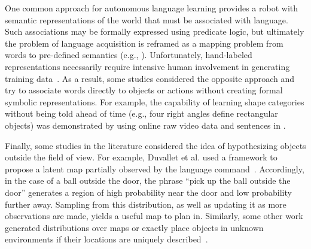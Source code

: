 One common approach for autonomous language learning provides a robot with semantic representations of the world that must be associated with language.
Such associations may be formally expressed using predicate logic, but ultimately the problem of language acquisition is reframed as a mapping problem from words to pre-defined semantics (e.g., \cite{langlearn1,langlearn2,formal1,formal2}).
Unfortunately, hand-labeled representations necessarily require intensive human involvement in generating training data~\cite{mooneypivot}.
As a result, some studies considered the opposite approach and try to associate words directly to objects or actions without creating formal symbolic representations.
For example, the capability of learning shape categories without being told ahead of time (e.g., four right angles define rectangular objects) was demonstrated by using online raw video data and sentences in \cite{langlearn3,langlearn4}.

Finally, some studies in the literature considered the idea of hypothesizing objects outside the field of view. For example, Duvallet et al. used a framework to propose a latent map partially observed by the language command~\cite{citeLangNoisySensor}.
Accordingly, in the case of a ball outside the door, the phrase ``pick up the ball outside the door'' generates a region of high probability near the door and low probability further away.
Sampling from this distribution, as well as updating it as more observations are made, yields a useful map to plan in.
Similarly, some other work generated distributions over maps or exactly place objects in unknown environments if their locations are uniquely described~\cite{learningSemanticMaps,outside1}.